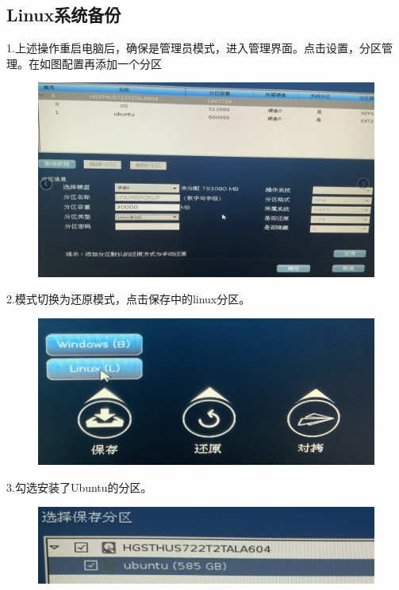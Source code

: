 \documentclass[openbib]{article}
\begin{document}
\subsection{Linux系统备份}
1.上述操作重启电脑后，确保是管理员模式，进入管理界面。点击设置，分区管理。在如图配置再添加一个分区
\begin{figure}[H]
	\centering
	\includegraphics[scale=0.3]{47}
\end{figure}

2.模式切换为还原模式，点击保存中的linux分区。
\begin{figure}[H]
	\centering
	\includegraphics[scale=0.3]{48}
\end{figure}

3.勾选安装了Ubuntu的分区。
\begin{figure}[H]
	\centering
	\includegraphics[scale=0.3]{49}
\end{figure}
\end{document}
